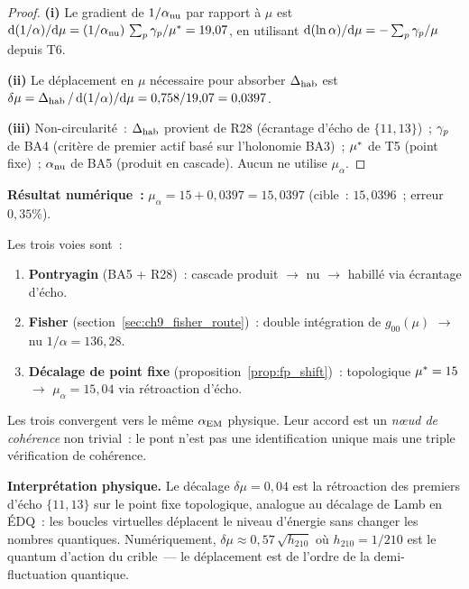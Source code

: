 \documentclass[12pt,a4paper]{article}
\begin{document}
\begin{proof}
\textbf{(i)} Le gradient de $1/\alpha_{\rm nu}$ par rapport à $\mu$ est
$\mathrm{d}(1/\alpha)/\mathrm{d}\mu
 = (1/\alpha_{\rm nu})\,\sum_p \gamma_{p}/{\mu^{*}} = 19{,}07$,
en utilisant $\mathrm{d}(\ln\alpha)/\mathrm{d}\mu
 = -\sum_p \gamma_{p}/\mu$ depuis T6.

\textbf{(ii)} Le déplacement en $\mu$ nécessaire pour absorber
$\Delta_{\rm hab}$ est $\delta\mu = \Delta_{\rm hab}\,/\,
\mathrm{d}(1/\alpha)/\mathrm{d}\mu = 0{,}758 / 19{,}07 = 0{,}0397$.

\textbf{(iii)} Non-circularité~: $\Delta_{\rm hab}$ provient de R28
(écrantage d'écho de $\{11,13\}$)~; $\gamma_{p}$ de BA4 (critère de
premier actif basé sur l'holonomie BA3)~; ${\mu^{*}}$ de T5 (point
fixe)~; $\alpha_{\rm nu}$ de BA5 (produit en cascade). Aucun ne
utilise $\mu_\alpha$.
\end{proof}

\noindent
\textbf{Résultat numérique~:}
$\mu_\alpha = 15 + 0{,}0397 = 15{,}0397$
(cible~: $15{,}0396$~; erreur $0{,}35\%$).

\begin{remarque}
\label{rem:three_routes}
Les trois voies sont~:
\begin{enumerate}[nosep]
\item \textbf{Pontryagin} (BA5 + R28)~: cascade produit
  $\to$ nu $\to$ habillé via écrantage d'écho.
\item \textbf{Fisher} (section~\ref{sec:ch9_fisher_route})~:
  double intégration de $g_{00}(\mu)$ $\to$ nu $1/\alpha = 136{,}28$.
\item \textbf{Décalage de point fixe} (proposition~\ref{prop:fp_shift})~:
  topologique ${\mu^{*}} = 15$ $\to$ $\mu_\alpha = 15{,}04$ via
  rétroaction d'écho.
\end{enumerate}
Les trois convergent vers le même $\alpha_{\mathrm{EM}}$ physique. Leur accord
est un \emph{n{\oe}ud de cohérence} non trivial~: le pont n'est pas
une identification unique mais une triple vérification de
cohérence.
\end{remarque}

\noindent
\textbf{Interprétation physique.}
Le décalage $\delta\mu = 0{,}04$ est la rétroaction des premiers
d'écho $\{11,13\}$ sur le point fixe topologique, analogue au
décalage de Lamb en ÉDQ~: les boucles virtuelles déplacent le niveau
d'énergie sans changer les nombres quantiques. Numériquement,
$\delta\mu \approx 0{,}57\,\sqrt{h_{210}}$ où $h_{210} = 1/210$ est
le quantum d'action du crible~--- le déplacement est de l'ordre de
la demi-fluctuation quantique.
\end{document}

